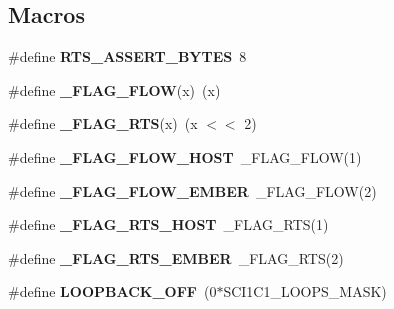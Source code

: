 \subsection*{Macros}
\begin{DoxyCompactItemize}
\item 
\mbox{\label{group__hal__hcs08_ga7c3a985c27600619d2bc4db511aff598}} 
\#define {\bfseries R\+T\+S\+\_\+\+A\+S\+S\+E\+R\+T\+\_\+\+B\+Y\+T\+ES}~8
\item 
\mbox{\label{group__hal__hcs08_ga4014e6eec5520cf4a6ef76ead07fb7ee}} 
\#define {\bfseries \+\_\+\+F\+L\+A\+G\+\_\+\+F\+L\+OW}(x)~(x)
\item 
\mbox{\label{group__hal__hcs08_ga1ffa0bde2db555fdfc6d8c1e076751a6}} 
\#define {\bfseries \+\_\+\+F\+L\+A\+G\+\_\+\+R\+TS}(x)~(x $<$$<$ 2)
\item 
\mbox{\label{group__hal__hcs08_gad4a243237dcc9407b96ff3ee542af5e0}} 
\#define {\bfseries \+\_\+\+F\+L\+A\+G\+\_\+\+F\+L\+O\+W\+\_\+\+H\+O\+ST}~\+\_\+\+F\+L\+A\+G\+\_\+\+F\+L\+OW(1)
\item 
\mbox{\label{group__hal__hcs08_ga1e9912dd7658dc97935822d8558379f0}} 
\#define {\bfseries \+\_\+\+F\+L\+A\+G\+\_\+\+F\+L\+O\+W\+\_\+\+E\+M\+B\+ER}~\+\_\+\+F\+L\+A\+G\+\_\+\+F\+L\+OW(2)
\item 
\mbox{\label{group__hal__hcs08_ga0e794f88b0b3a3936752efbfc6ca18db}} 
\#define {\bfseries \+\_\+\+F\+L\+A\+G\+\_\+\+R\+T\+S\+\_\+\+H\+O\+ST}~\+\_\+\+F\+L\+A\+G\+\_\+\+R\+TS(1)
\item 
\mbox{\label{group__hal__hcs08_ga9ba3c976fe95439424c64615bbb17f3f}} 
\#define {\bfseries \+\_\+\+F\+L\+A\+G\+\_\+\+R\+T\+S\+\_\+\+E\+M\+B\+ER}~\+\_\+\+F\+L\+A\+G\+\_\+\+R\+TS(2)
\item 
\mbox{\label{group__hal__hcs08_ga08e617305a992b712a63f4da735ceb00}} 
\#define {\bfseries L\+O\+O\+P\+B\+A\+C\+K\+\_\+\+O\+FF}~(0$\ast$S\+C\+I1\+C1\+\_\+\+L\+O\+O\+P\+S\+\_\+\+M\+A\+SK)
\item 
\mbox{\label{group__hal__hcs08_ga7e1861e44c67148b15f190a3db2dae68}} 
$$
\end{DoxyCompactItemize}
